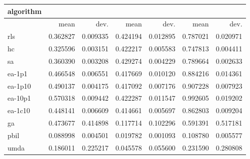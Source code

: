\begin{tabular}{@{}l*{6}{>{{}}N{1}{2}}@{}}
\toprule
{algorithm} &  &  &  \\
\midrule
& {mean} & {dev.} & {mean} & {dev.} & {mean} & {dev.} \\
\midrule
rls & 0.362827 & 0.009335 & 0.424194 & 0.012895 & 0.787021 & 0.020971 \\
 hc & 0.325596 & 0.003151 & 0.422217 & 0.005583 & 0.747813 & 0.004411 \\
 sa & 0.360390 & 0.003208 & 0.429274 & 0.004229 & 0.789664 & 0.002633 \\
 ea-1p1 & 0.466548 & 0.006551 & 0.417669 & 0.010120 & 0.884216 & 0.014361 \\
 ea-1p10 & 0.490137 & 0.004175 & 0.417092 & 0.007176 & 0.907228 & 0.007923 \\
 ea-10p1 & 0.570318 & 0.009442 & 0.422287 & 0.011547 & 0.992605 & 0.019202 \\
 ea-1c10 & 0.448141 & 0.006609 & 0.414661 & 0.005697 & 0.862803 & 0.009204 \\
 ga & 0.473677 & 0.414898 & 0.117714 & 0.102296 & 0.591391 & 0.517181 \\
 pbil & 0.088998 & 0.004501 & 0.019782 & 0.001093 & 0.108780 & 0.005577 \\
 umda & 0.186011 & 0.225217 & 0.045578 & 0.055600 & 0.231590 & 0.280808 \\
 \bottomrule
\end{tabular}
